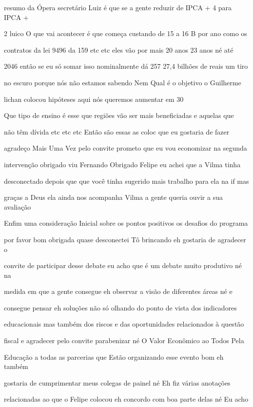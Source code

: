\documentclass[a4paper,12pt]{article}
\begin{document}
resumo da Ópera secretário Luiz é que se a gente reduzir de IPCA + 4 para IPCA +

2 luico O que vai acontecer é que começa custando de 15 a 16 B por ano como os

contratos da lei 9496 da 159 etc etc eles vão por mais 20 anos 23 anos né até

2046 então se eu só somar isso nominalmente dá 257 27,4 bilhões de reais um tiro

no escuro porque nós não estamos sabendo Nem Qual é o objetivo o Guilherme

lichan colocou hipóteses aqui nós queremos aumentar em 30%

Que tipo de ensino é esse que regiões vão ser mais beneficiadas e aquelas que

não têm dívida etc etc etc Então são essas as coloc que eu gostaria de fazer

agradeço Mais Uma Vez pelo convite prometo que eu vou economizar na segunda

intervenção obrigado viu Fernando Obrigado Felipe eu achei que a Vilma tinha

desconectado depois que que você tinha sugerido mais trabalho para ela na if mas

graças a Deus ela ainda nos acompanha Vilma a gente queria ouvir a sua avaliação

Enfim uma consideração Inicial sobre os pontos positivos os desafios do programa

por favor bom obrigada quase desconectei Tô brincando eh gostaria de agradecer o

convite de participar desse debate eu acho que é um debate muito produtivo né na

medida em que a gente consegue eh observar a visão de diferentes áreas né e

consegue pensar eh soluções não só olhando do ponto de vista dos indicadores

educacionais mas também dos riscos e das oportunidades relacionados à questão

fiscal e agradecer pelo convite parabenizar né O Valor Econômico ao Todos Pela

Educação a todas as parcerias que Estão organizando esse evento bom eh também

gostaria de cumprimentar meus colegas de painel né Eh fiz várias anotações

relacionadas ao que o Felipe colocou eh concordo com boa parte delas né Eu acho
\end{document}
